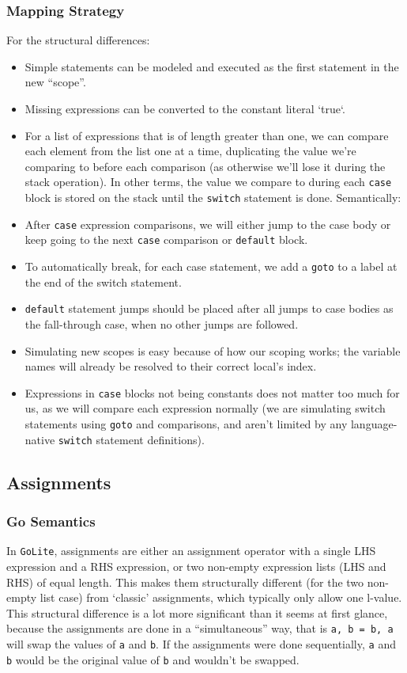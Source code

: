 \documentclass[11pt]{article}
\begin{document}
\subsubsection{Mapping Strategy}
\label{sec:orgb129eb0}
For the structural differences:
\begin{itemize}[noitemsep]
\item Simple statements can be modeled and executed as the first statement in
the new ``scope''.
\item Missing expressions can be converted to the constant literal `true`.
\item For a list of expressions that is of length greater than one, we
can compare each element from the list one at a time,
duplicating the value we're comparing to before each comparison
(as otherwise we'll lose it during the stack operation). In
other terms, the value we compare to during each \texttt{case} block is
stored on the stack until the \texttt{switch} statement is done.
Semantically:
\end{itemize}
\begin{itemize}[noitemsep]
\item After \texttt{case} expression comparisons, we will either jump to the case body
or keep going to the next \texttt{case} comparison or \texttt{default} block.
\item To automatically break, for each case statement, we add a \texttt{goto}
to a label at the end of the switch statement.
\item \texttt{default} statement jumps should be placed after all jumps to case bodies
as the fall-through case, when no other jumps are followed.
\item Simulating new scopes is easy because of how our scoping works;
the variable names will already be resolved to their correct
local's index.
\item Expressions in \texttt{case} blocks not being constants does not matter too much
for us, as we will compare each expression normally (we are
simulating switch statements using \texttt{goto} and comparisons, and
aren't limited by any language-native \texttt{switch} statement
definitions).
\end{itemize}
\subsection{Assignments}
\label{sec:orgac321ff}
\subsubsection{Go Semantics}
\label{sec:orgefa07e9}
In \texttt{GoLite}, assignments are either an assignment operator with a
single LHS expression and a RHS expression, or two non-empty
expression lists (LHS and RHS) of equal length. This makes them
structurally different (for the two non-empty list case) from
`classic' assignments, which typically only allow one l-value.
This structural difference is a lot more significant than it seems
at first glance, because the assignments are done in a
``simultaneous'' way, that is \texttt{a, b = b, a} will swap the values
of \texttt{a} and \texttt{b}. If the assignments were done sequentially, \texttt{a} and
\texttt{b} would be the original value of \texttt{b} and wouldn't be swapped.
\end{document}
